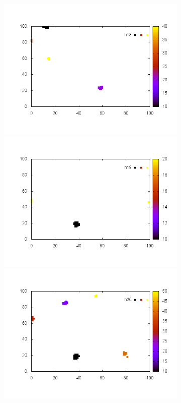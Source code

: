 \documentclass[10pt,a4paper]{article}
\begin{document}
\begin{figure}
\begin{subfigure}[b]{1\textwidth}
\includegraphics[scale=.3]{./img/SCC_Stable3/cut95p/18.png}
\includegraphics[scale=.3]{./img/SCC_Stable3/cut95p/19.png}
\includegraphics[scale=.3]{./img/SCC_Stable3/cut95p/20.png}

\end{subfigure}
\end{figure}
\end{document}
